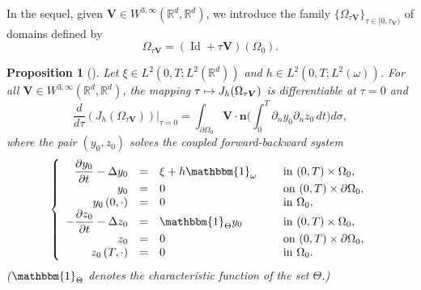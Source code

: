 \documentclass[10pt,a4paper]{amsart}
\newcommand\mto{\mathchoice{\longmapsto}{\mapsto}{\mapsto}{\mapsto}}
\newcommand{\bn}{\boldsymbol{n}}
\newcommand{\bV}{\boldsymbol{V}}
\DeclareMathOperator{\Id}{Id}
\newcommand\R{{\mathbb R}}
\newtheorem{proposition}[theorem]{Proposition}
\theoremstyle{definition}
\begin{document}
In the sequel, given $\bV\in W^{3,\infty}(\R^d, \R^d)$, we introduce the family $\{\Omega_{\tau\bV}\}_{\tau\in [0,\tau_{\bV})}$ of domains defined by
\[
\Omega_{\tau\bV}= (\Id+\tau\bV)(\Omega_0).
\]

\begin{proposition}[{\cite[Proof of Prop.\,1.1]{Lissy-Privat-Simpore}}]
\label{Prop-J-differentiable}
Let $\xi \in L^2(0,T; L^2(\R^d))$ and $h \in L^2(0,T; L^2(\omega))$. For all $ \bV \in W^{3, \infty} (\R^d, \R^d)$, the mapping $\tau \mto J_h(\Omega_{\tau\bV})$ is differentiable at $\tau = 0$ and
\begin{equation}
\dfrac{d }{d \tau}\left({J}_h\left(\Omega_{\tau\bV} \right)\right)\Big|_{\tau=0}
\label{Diff-J-V-2}
=
\int_{\partial\Omega_0} \bV \cdot \bn \biggl(\int_0^T \partial_n y_0 \partial_n z_0 \, dt\biggr) d\sigma,
\end{equation}
where the pair $(y_0,z_0)$ solves the coupled forward-backward system
\begin{equation}
\label{y-Omega-0-h}
\left\{
\begin{array}{rcll}
\dfrac{\partial y_0}{\partial t}-\Delta y_0 &=&\xi +h\mathbbm{1}_{\omega}\quad&\text{ in }(0,T) \times \Omega_0,
\\
y_0 &=& 0 &\text{ on }(0,T) \times \partial \Omega_0,
\\
y_0\left(0,\cdot\right) &=& 0 &\text{ in }\Omega_0,
\\
-\dfrac{\partial z_0}{\partial t}-\Delta z_0 &=&\mathbbm{1}_{\Theta}y_0 &\text{ in }(0,T) \times \Omega_0,
\\
z_0 &=& 0 &\text{ on }(0,T) \times \partial \Omega_0,
\\
z_0\left(T,\cdot\right) &=& 0 &\text{ in }\Omega_0.
\end{array}
\right.
\end{equation}
($\mathbbm{1}_\Theta$ denotes the characteristic function of the set $\Theta$.)
\end{proposition}
\end{document}
